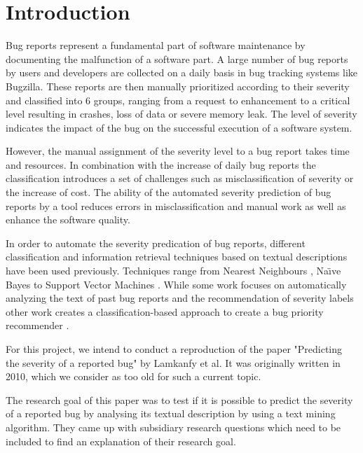 \documentclass[sigconf,screen]{acmart}
\begin{document}
\section{Introduction}
Bug reports represent a fundamental part of software maintenance by documenting the malfunction of a software part. A large number of bug reports by users and developers are collected on a daily basis in bug tracking systems like Bugzilla. These reports are then manually prioritized according to their severity and classified into 6 groups, ranging from a request to enhancement to a critical level resulting in crashes, loss of data or severe memory leak. The level of severity indicates the impact of the bug on the successful execution of a software system.

However, the manual assignment of the severity level to a bug report takes time and resources. In combination with the increase of daily bug reports the classification introduces a set of challenges such as misclassification of severity or the increase of cost. The ability of the automated severity prediction of bug reports by a tool reduces errors in misclassification and manual work as well as enhance the software quality.

In order to automate the severity predication of bug reports, different classification and information retrieval techniques based on textual descriptions have been used previously. Techniques range from Nearest Neighbours \cite{TianDrone} \cite{LamkanfiMiningAlgo} \cite{ChaturvediBugSeverity}, Na{\"\i}ve Bayes \cite{LamkanfiMiningAlgo} \cite{ChaturvediBugSeverity} to Support Vector Machines \cite{KanwalOMSVM} \cite{LamkanfiMiningAlgo} \cite{ChaturvediBugSeverity}. While some work focuses on automatically analyzing the text of past bug reports and the recommendation of severity labels \cite{TianDrone} \cite{LamkanfiMiningAlgo} \cite{ChaturvediBugSeverity} other work creates a classification-based approach to create a bug priority recommender \cite{KanwalOMSVM}.

For this project, we intend to conduct a reproduction of the paper "Predicting the severity of a reported bug" \cite{ourPaper} by Lamkanfy et al. It was originally written in 2010, which we consider as too old for such a current topic. 

The research goal of this paper was to test if it is possible to predict the severity of a reported bug by analysing its textual description by using a text mining algorithm. They came up with subsidiary research questions which need to be included to find an explanation of their research goal.
\end{document}
